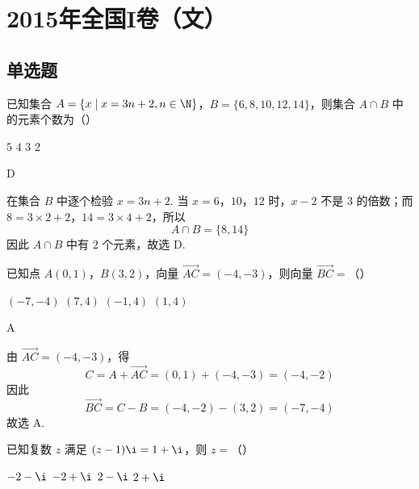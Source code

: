 
\chapter{2015年全国I卷（文）}

\section{单选题}

\begin{problem}
已知集合 \(A = \{x \mid x = 3n + 2, n \in \N\}\)，\(B = \{6, 8, 10, 12, 14\}\)，则集合 \(A \cap B\) 中的元素个数为（\quad）

\choices
    {\(5\)}
    {\(4\)}
    {\(3\)}
    {\(2\)}
\end{problem}

\begin{answer}
D
\end{answer}

\begin{solution}
在集合 \(B\) 中逐个检验 \(x=3n+2\). 当 \(x=6\)，\(10\)，\(12\) 时，\(x-2\) 不是 \(3\) 的倍数；而 \(8=3\times2+2\)，\(14=3\times4+2\)，所以
\[
A\cap B=\{8,14\}
\]
因此 \(A\cap B\) 中有 \(2\) 个元素，故选 D.
\end{solution}

\begin{problem}
已知点 \(A(0,1)\)，\(B(3,2)\)，向量 \(\overrightarrow{AC} = (-4, -3)\)，则向量 \(\overrightarrow{BC} =\)（\quad）

\choices
    {\((-7, -4)\)}
    {\((7, 4)\)}
    {\((-1, 4)\)}
    {\((1, 4)\)}
\end{problem}

\begin{answer}
A
\end{answer}

\begin{solution}
由 \(\overrightarrow{AC}=(-4,-3)\)，得
\[
C=A+\overrightarrow{AC}=(0,1)+(-4,-3)=(-4,-2)
\]
因此
\[
\overrightarrow{BC}=C-B=(-4,-2)-(3,2)=(-7,-4)
\]
故选 A.
\end{solution}

\begin{problem}
已知复数 \(z\) 满足 \((z - 1)\i = 1 + \i\)，则 \(z =\)（\quad）

\choices
    {\(-2 - \i\)}
    {\(-2 + \i\)}
    {\(2 - \i\)}
    {\(2 + \i\)}
\end{problem}

